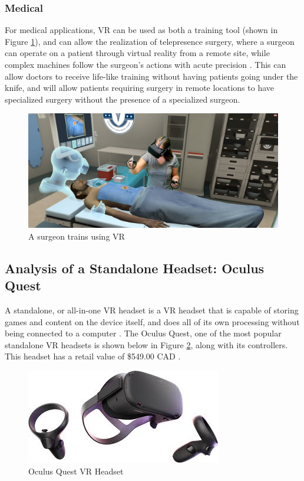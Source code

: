 \subsubsection{Medical}
For medical applications, VR can be used as both a training tool (shown in
Figure \ref{vr:med_train}), and can allow the realization of telepresence 
surgery, where a surgeon can operate on a patient through virtual reality 
from a remote site, while complex machines follow the surgeon's actions 
with acute precision \cite{vr_med_app}. This can allow doctors to receive
life-like training without having patients going under the knife, and will allow
patients requiring surgery in remote locations to have specialized surgery without the
presence of a specialized surgeon.

\begin{figure}[h!]
    \centering
    \includegraphics[width=.6\linewidth]{media/med_training_vr.jpg}
    \caption{A surgeon trains using VR \cite{med_train_vr}}
    \label{vr:med_train}
\end{figure}

\subsection{Analysis of a Standalone Headset: Oculus Quest}
A standalone, or all-in-one VR headset is a VR headset that is capable of storing games and
content on the device itself, and does all of its own processing without being connected
to a computer \cite{standalone_vr}. The Oculus Quest, one of the most popular
standalone VR headsets is shown below in Figure \ref{headsets:pictures}, along with
its controllers. This headset has a retail value of \$549.00 CAD \cite{quest_price}.

\begin{figure}[h]
    \centering
    \includegraphics[width=.6\linewidth]{media/oculus_quest.jpg}
    \caption{Oculus Quest VR Headset \cite{quest_headset}}
    \label{headsets:pictures}
\end{figure}

